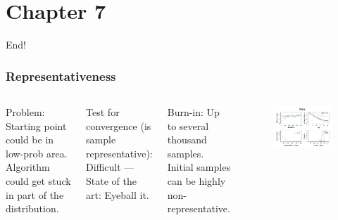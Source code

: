 \documentclass[usenames,dvipsnames,table]{beamer}
\begin{document}
\section{Chapter 7}
\begin{frame}
\begin{center}
{\huge{End!}}
\\\vspace{2em}
\end{center}
\end{frame}

\begin{frame}
\frametitle{Representativeness}
\begin{columns}[c]
Problem: Starting point could be in low-prob area. Algorithm could get stuck in part of the distribution.

\vspace{1em}
Test for convergence (is sample representative): Difficult --- State of the art: Eyeball it.

\vspace{1em}
Burn-in: Up to several thousand samples. Initial samples can be highly non-representative.
\begin{figure}
\centering
\includegraphics[height=0.6\textheight]{img/fig7_10}
\end{figure}
\end{columns}
\end{frame}
\end{document}
